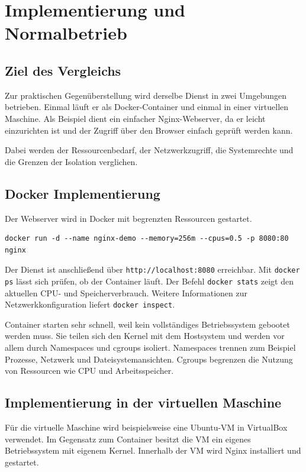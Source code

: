 \documentclass[conference]{IEEEtran}
\begin{document}
\section{Implementierung und Normalbetrieb}
\label{Implementierung und Normalbetrieb}

\subsection{Ziel des Vergleichs}
Zur praktischen Gegenüberstellung wird derselbe Dienst in zwei Umgebungen
betrieben. Einmal läuft er als Docker-Container und einmal in einer virtuellen
Maschine. Als Beispiel dient ein einfacher Nginx-Webserver, da er leicht
einzurichten ist und der Zugriff über den Browser einfach geprüft werden kann.

Dabei werden der Ressourcenbedarf, der Netzwerkzugriff, die Systemrechte und
die Grenzen der Isolation verglichen.

\subsection{Docker Implementierung}
Der Webserver wird in Docker mit begrenzten Ressourcen gestartet.

\begin{lstlisting}
docker run -d --name nginx-demo --memory=256m --cpus=0.5 -p 8080:80 nginx
\end{lstlisting}

Der Dienst ist anschließend über \texttt{http://localhost:8080} erreichbar.
Mit \texttt{docker ps} lässt sich prüfen, ob der Container läuft. Der Befehl
\texttt{docker stats} zeigt den aktuellen CPU- und Speicherverbrauch. Weitere
Informationen zur Netzwerkkonfiguration liefert \texttt{docker inspect}.

Container starten sehr schnell, weil kein vollständiges Betriebssystem gebootet
werden muss. Sie teilen sich den Kernel mit dem Hostsystem und werden vor allem
durch Namespaces und cgroups isoliert. Namespaces trennen zum Beispiel Prozesse,
Netzwerk und Dateisystemansichten. Cgroups begrenzen die Nutzung von Ressourcen
wie CPU und Arbeitsspeicher.

\subsection{Implementierung in der virtuellen Maschine}
Für die virtuelle Maschine wird beispielsweise eine Ubuntu-VM in VirtualBox
verwendet. Im Gegensatz zum Container besitzt die VM ein eigenes Betriebssystem
mit eigenem Kernel. Innerhalb der VM wird Nginx installiert und gestartet.
\end{document}
